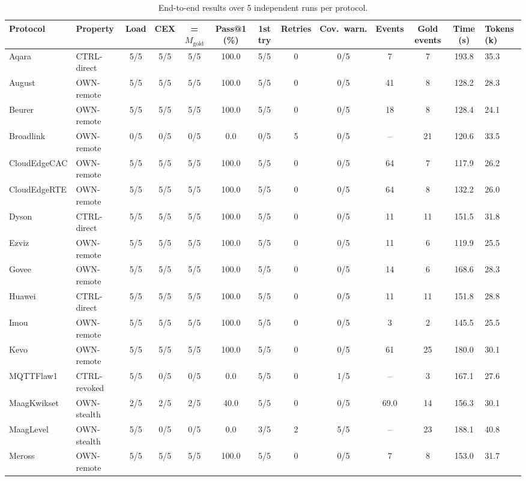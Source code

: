 \begin{table}[t]
\centering
\scriptsize
\caption{End-to-end results over 5 independent runs per protocol.}
\label{tab:pilot_eval_matrix}
\begin{tabular*}{\linewidth}{@{\extracolsep{\fill}} ll ccccc ccc cc @{}}
\hline\hline
\textbf{Protocol} & \textbf{Property} & \textbf{Load} & \textbf{CEX} & \textbf{= $M_{\mathrm{gold}}$} & \textbf{Pass@1 (\%)} & \textbf{1st try} & \textbf{Retries} & \textbf{Cov.\ warn.} & \textbf{Events} & \textbf{Gold events} & \textbf{Time (s)} & \textbf{Tokens (k)} \\
\hline
Aqara & CTRL-direct & 5/5 & 5/5 & 5/5 & 100.0 & 5/5 & 0 & 0/5 & 7 & 7 & 193.8 & 35.3 \\
August & OWN-remote & 5/5 & 5/5 & 5/5 & 100.0 & 5/5 & 0 & 0/5 & 41 & 8 & 128.2 & 28.3 \\
Beurer & OWN-remote & 5/5 & 5/5 & 5/5 & 100.0 & 5/5 & 0 & 0/5 & 18 & 8 & 128.4 & 24.1 \\
Broadlink & OWN-remote & 0/5 & 0/5 & 0/5 & 0.0 & 0/5 & 5 & 0/5 & -- & 21 & 120.6 & 33.5 \\
CloudEdgeCAC & OWN-remote & 5/5 & 5/5 & 5/5 & 100.0 & 5/5 & 0 & 0/5 & 64 & 7 & 117.9 & 26.2 \\
CloudEdgeRTE & OWN-remote & 5/5 & 5/5 & 5/5 & 100.0 & 5/5 & 0 & 0/5 & 64 & 8 & 132.2 & 26.0 \\
Dyson & CTRL-direct & 5/5 & 5/5 & 5/5 & 100.0 & 5/5 & 0 & 0/5 & 11 & 11 & 151.5 & 31.8 \\
Ezviz & OWN-remote & 5/5 & 5/5 & 5/5 & 100.0 & 5/5 & 0 & 0/5 & 11 & 6 & 119.9 & 25.5 \\
Govee & OWN-remote & 5/5 & 5/5 & 5/5 & 100.0 & 5/5 & 0 & 0/5 & 14 & 6 & 168.6 & 28.3 \\
Huawei & CTRL-direct & 5/5 & 5/5 & 5/5 & 100.0 & 5/5 & 0 & 0/5 & 11 & 11 & 151.8 & 28.8 \\
Imou & OWN-remote & 5/5 & 5/5 & 5/5 & 100.0 & 5/5 & 0 & 0/5 & 3 & 2 & 145.5 & 25.5 \\
Kevo & OWN-remote & 5/5 & 5/5 & 5/5 & 100.0 & 5/5 & 0 & 0/5 & 61 & 25 & 180.0 & 30.1 \\
MQTTFlaw1 & CTRL-revoked & 5/5 & 0/5 & 0/5 & 0.0 & 5/5 & 0 & 1/5 & -- & 3 & 167.1 & 27.6 \\
MaagKwikset & OWN-stealth & 2/5 & 2/5 & 2/5 & 40.0 & 5/5 & 0 & 0/5 & 69.0 & 14 & 156.3 & 30.1 \\
MaagLevel & OWN-stealth & 5/5 & 0/5 & 0/5 & 0.0 & 3/5 & 2 & 5/5 & -- & 23 & 188.1 & 40.8 \\
Meross & OWN-remote & 5/5 & 5/5 & 5/5 & 100.0 & 5/5 & 0 & 0/5 & 7 & 8 & 153.0 & 31.7 \\

\end{tabular*}
\end{table}
